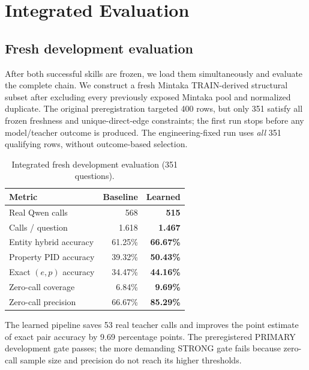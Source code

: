 \documentclass[10pt]{article}
\begin{document}
\section{Integrated Evaluation}

\subsection{Fresh development evaluation}
After both successful skills are frozen, we load them simultaneously and evaluate the complete chain. We construct a fresh Mintaka TRAIN-derived structural subset after excluding every previously exposed Mintaka pool and normalized duplicate. The original preregistration targeted 400 rows, but only 351 satisfy all frozen freshness and unique-direct-edge constraints; the first run stops before any model/teacher outcome is produced. The engineering-fixed run uses \emph{all} 351 qualifying rows, without outcome-based selection.

\begin{table}[t]
\centering
\caption{Integrated fresh development evaluation (351 questions).}
\label{tab:dev}
\begin{tabular}{lrr}
\toprule
Metric & Baseline & Learned \\
\midrule
Real Qwen calls & 568 & \textbf{515} \\
Calls / question & 1.618 & \textbf{1.467} \\
Entity hybrid accuracy & 61.25\% & \textbf{66.67\%} \\
Property PID accuracy & 39.32\% & \textbf{50.43\%} \\
Exact $(e,p)$ accuracy & 34.47\% & \textbf{44.16\%} \\
Zero-call coverage & 6.84\% & \textbf{9.69\%} \\
Zero-call precision & 66.67\% & \textbf{85.29\%} \\
\bottomrule
\end{tabular}
\end{table}

The learned pipeline saves 53 real teacher calls and improves the point estimate of exact pair accuracy by 9.69 percentage points. The preregistered PRIMARY development gate passes; the more demanding STRONG gate fails because zero-call sample size and precision do not reach its higher thresholds.
\end{document}
